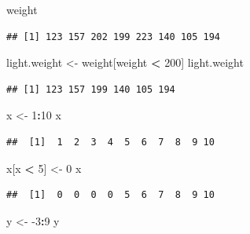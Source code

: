 \documentclass[
]{krantz}
\newenvironment{Shaded}{\begin{snugshade}}{\end{snugshade}}
\newcommand{\DecValTok}[1]{\textcolor[rgb]{0.00,0.00,0.81}{#1}}
\newcommand{\NormalTok}[1]{#1}
\newcommand{\OperatorTok}[1]{\textcolor[rgb]{0.81,0.36,0.00}{\textbf{#1}}}
\newcommand{\StringTok}[1]{\textcolor[rgb]{0.31,0.60,0.02}{#1}}
\begin{document}
\begin{Shaded}
\begin{Highlighting}[]
\NormalTok{weight}
\end{Highlighting}
\end{Shaded}

\begin{verbatim}
## [1] 123 157 202 199 223 140 105 194
\end{verbatim}

\begin{Shaded}
\begin{Highlighting}[]
\NormalTok{light.weight \textless{}{-}}\StringTok{ }\NormalTok{weight[weight }\OperatorTok{\textless{}}\StringTok{ }\DecValTok{200}\NormalTok{]}
\NormalTok{light.weight}
\end{Highlighting}
\end{Shaded}

\begin{verbatim}
## [1] 123 157 199 140 105 194
\end{verbatim}

\begin{Shaded}
\begin{Highlighting}[]
\NormalTok{x \textless{}{-}}\StringTok{ }\DecValTok{1}\OperatorTok{:}\DecValTok{10}
\NormalTok{x}
\end{Highlighting}
\end{Shaded}

\begin{verbatim}
##  [1]  1  2  3  4  5  6  7  8  9 10
\end{verbatim}

\begin{Shaded}
\begin{Highlighting}[]
\NormalTok{x[x }\OperatorTok{\textless{}}\StringTok{ }\DecValTok{5}\NormalTok{] \textless{}{-}}\StringTok{ }\DecValTok{0}
\NormalTok{x}
\end{Highlighting}
\end{Shaded}

\begin{verbatim}
##  [1]  0  0  0  0  5  6  7  8  9 10
\end{verbatim}

\begin{Shaded}
\begin{Highlighting}[]
\NormalTok{y \textless{}{-}}\StringTok{ }\DecValTok{{-}3}\OperatorTok{:}\DecValTok{9}
\NormalTok{y}
\end{Highlighting}
\end{Shaded}
\end{document}
